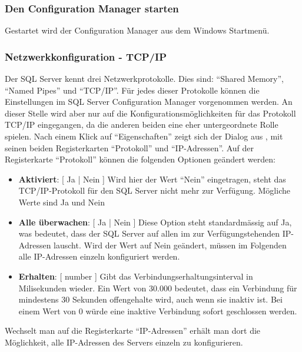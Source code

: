         \subsubsection{Den Configuration Manager starten}
          Gestartet wird der Configuration Manager aus dem Windows Startmenü.
        \subsubsection{Netzwerkkonfiguration - TCP/IP}
          Der SQL Server kennt drei Netzwerkprotokolle. Dies sind:
          \enquote{Shared Memory}, \enquote{Named Pipes} und \enquote{TCP/IP}. Für
          jedes dieser Protokolle können die Einstellungen im SQL Server
          Configuration Manager vorgenommen werden. An dieser Stelle wird aber nur
          auf die Konfigurationsmöglichkeiten für das Protokoll TCP/IP
          eingegangen, da die anderen beiden eine eher untergeordnete Rolle
          spielen. 
          Nach einem Klick auf \enquote{Eigenschaften} zeigt sich der Dialog aus
          , mit
          seinen beiden Registerkarten \enquote{Protokoll} und
          \enquote{IP-Adressen}.
          Auf der Registerkarte \enquote{Protokoll} können die folgenden Optionen
          geändert werden:
          \begin{itemize}
              \item \textbf{Aktiviert}: [ Ja | Nein ] Wird hier der Wert
              \enquote{Nein} eingetragen, steht das TCP/IP-Protokoll für den SQL Server nicht
              mehr zur Verfügung. Mögliche Werte sind Ja und Nein
              \item \textbf{Alle überwachen}: [ Ja | Nein ] Diese Option steht
              standardmässig auf Ja, was bedeutet, dass der SQL Server auf allen im zur
              Verfügungstehenden IP-Adressen lauscht. Wird der Wert auf Nein
              geändert, müssen im Folgenden alle IP-Adressen einzeln konfiguriert
              werden.
              \item \textbf{Erhalten}: [ number ] Gibt das
              Verbindungserhaltungsinterval in Milisekunden wieder. Ein Wert von 30.000 bedeutet, dass ein
              Verbindung für mindestens 30 Sekunden offengehalte wird, auch wenn
              sie inaktiv ist. Bei einem Wert von 0 würde eine inaktive Verbindung
              sofort geschlossen werden.
          \end{itemize}
          Wechselt man auf die Registerkarte \enquote{IP-Adressen} erhält man
          dort die Möglichkeit, alle IP-Adressen des Servers einzeln zu
          konfigurieren.
          
